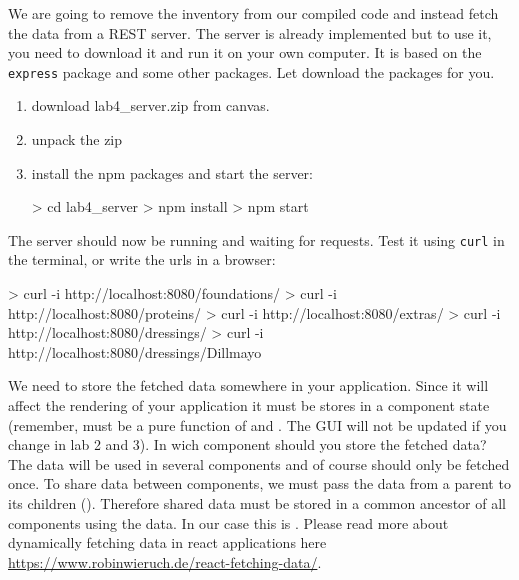 \documentclass[fleqn, article, a4paper]{memoir}
\begin{document}
\begin{Assignments}

\item We are going to remove the inventory from our compiled code and instead fetch the data from a REST server. The server is already implemented but to use it, you need to download it and run it on your own computer. It is based on the \texttt{express} package and some other packages. Let  download the packages for you.
\begin{enumerate}
  \item download lab4\_server.zip from canvas.
  \item unpack the zip
  \item install the npm packages and start the server:
\begin{Code}
> cd lab4_server
> npm install
> npm start
\end{Code}
\end{enumerate}
The server should now be running and waiting for requests. Test it using \texttt{curl} in the terminal, or write the urls in a browser:
\begin{Code}
> curl -i http://localhost:8080/foundations/
> curl -i http://localhost:8080/proteins/
> curl -i http://localhost:8080/extras/
> curl -i http://localhost:8080/dressings/
> curl -i http://localhost:8080/dressings/Dillmayo
\end{Code}


\item We need to store the fetched data somewhere in your application. Since it will affect the rendering of your application it must be stores in a component state (remember,  must be a pure function of  and . The GUI will not be updated if you change  in lab 2 and 3). In wich component should you store the fetched data? The data will be used in several components and of course should only be fetched once. To share data between components, we must pass the data from a parent to its children (). Therefore shared data must be stored in a common ancestor of all components using the data. In our case this is . Please read more about dynamically fetching data in react applications here \url{https://www.robinwieruch.de/react-fetching-data/}.


\end{Assignments}
\end{document}
